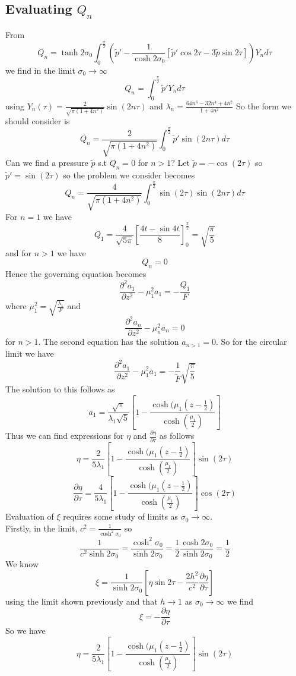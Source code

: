 \documentclass[12pt]{article}
\begin{document}
\subsection{Evaluating $Q_n$}
From $$Q_n=\tanh 2\sigma_0 \int_0^{\frac{\pi}{2}} \left(\tilde{p}'-\frac{1}{\cosh 2\sigma_0}\left[\tilde{p}'\cos 2\tau - 3\tilde{p}\sin 2\tau\right]\right) Y_n d\tau$$ we find in the limit $\sigma_0 \rightarrow \infty$ $$Q_n=\int_0^{\frac{\pi}{2}}\tilde{p}'Y_n d\tau$$ using $Y_n(\tau)=\frac{2}{\sqrt{\pi(1+4n^2)}}\sin(2n\tau)$ and $\lambda_n=\frac{64n^6-32n^4+4n^2}{1+4n^2}$ So the form we should consider is 
$$Q_n=\frac{2}{\sqrt{\pi(1+4n^2)}}\int_0^{\frac{\pi}{2}}\tilde{p}'\sin(2n\tau)d\tau$$ Can we find a pressure $\tilde{p}$ s.t $Q_n=0$ for $n>1$?
Let $\tilde{p}=-\cos(2\tau)$ so $\tilde{p}'=\sin(2\tau)$ so the problem we consider becomes $$Q_n=\frac{4}{\sqrt{\pi(1+4n^2)}}\int_0^{\frac{\pi}{2}}\sin(2\tau)\sin(2n\tau)d\tau$$
For $n=1$ we have $$Q_1=\frac{4}{\sqrt{5\pi}}\left[\frac{4t-\sin4t}{8}\right]_0^{\frac{\pi}{2}}=\sqrt{\frac{\pi}{5}}$$
and for $n>1$ we have $$Q_n=0$$
Hence the governing equation becomes $$\frac{\partial^2a_1}{\partial z^2}-\mu_1^2a_1=-\frac{Q_1}{F}$$ where $\mu_1^2=\sqrt{\frac{\lambda_1}{F}}$
and $$\frac{\partial^2a_n}{\partial z^2}-\mu_n^2a_n=0$$ for $n>1$. The second equation has the solution $a_{n>1}=0$. So for the circular limit we have 
$$\frac{\partial^2a_1}{\partial z^2}-\mu_1^2a_1=-\frac{1}{\tilde{F}}\sqrt{\frac{\pi}{5}}$$
The solution to this follows as $$a_1=\frac{\sqrt{\pi}}{\lambda_1\sqrt{5}}\left[1-\frac{\cosh(\mu_1(z-\frac{1}{2})}{\cosh(\frac{\mu_1}{2})}\right]$$
Thus we can find expressions for $\eta$ and $\frac{\partial \eta}{\partial \tau}$ as follows 
$$\eta = \frac{2}{5\lambda_1}\left[1-\frac{\cosh(\mu_1(z-\frac{1}{2})}{\cosh(\frac{\mu_1}{2})}\right]\sin(2\tau)$$
$$\frac{\partial \eta}{\partial \tau} = \frac{4}{5\lambda_1}\left[1-\frac{\cosh(\mu_1(z-\frac{1}{2})}{\cosh(\frac{\mu_1}{2})}\right]\cos(2\tau)$$
Evaluation of $\xi$ requires some study of limits as $\sigma_0\rightarrow \infty$.
\\ Firstly, in the limit, $c^2=\frac{1}{\cosh^2\sigma_0}$ so $$\frac{1}{c^2\sinh 2\sigma_0}=\frac{\cosh^2\sigma_0}{\sinh 2\sigma_0}=\frac{1}{2}\frac{\cosh2\sigma_0}{\sinh2\sigma_0}=\frac{1}{2}$$
We know $$\xi=\frac{1}{\sinh2\sigma_0}\left[\eta\sin2\tau - \frac{2h^2}{c^2}\frac{\partial \eta}{\partial \tau}\right]$$ using the limit shown previously and that $h\rightarrow 1$ as $\sigma_0 \rightarrow \infty$ we find 
$$\xi=-\frac{\partial \eta}{\partial \tau}$$
So we have $$\eta = \frac{2}{5\lambda_1}\left[1-\frac{\cosh(\mu_1(z-\frac{1}{2})}{\cosh(\frac{\mu_1}{2})}\right]\sin(2\tau)$$
\end{document}
